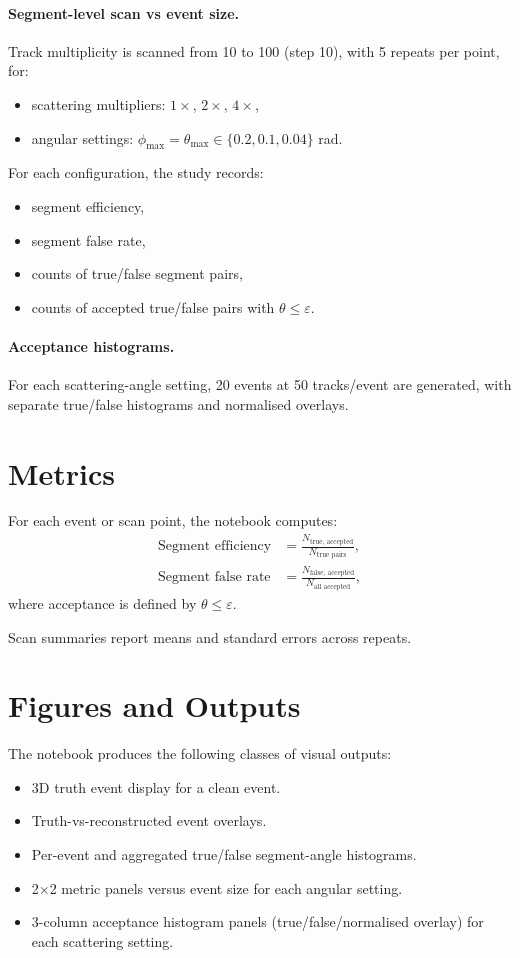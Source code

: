 \documentclass[11pt,a4paper]{article}
\begin{document}
\paragraph{Segment-level scan vs event size.}
Track multiplicity is scanned from 10 to 100 (step 10), with 5 repeats per
point, for:
\begin{itemize}[leftmargin=1.5em]
  \item scattering multipliers: $1\times$, $2\times$, $4\times$,
  \item angular settings: $\phi_{\max}=\theta_{\max}\in\{0.2,0.1,0.04\}$ rad.
\end{itemize}
For each configuration, the study records:
\begin{itemize}[leftmargin=1.5em]
  \item segment efficiency,
  \item segment false rate,
  \item counts of true/false segment pairs,
  \item counts of accepted true/false pairs with $\theta\le\varepsilon$.
\end{itemize}

\paragraph{Acceptance histograms.}
For each scattering-angle setting, 20 events at 50 tracks/event are generated,
with separate true/false histograms and normalised overlays.

\section{Metrics}
For each event or scan point, the notebook computes:
\begin{align}
\text{Segment efficiency} &=
\frac{N_{\text{true, accepted}}}{N_{\text{true pairs}}},\\
\text{Segment false rate} &=
\frac{N_{\text{false, accepted}}}{N_{\text{all accepted}}},
\end{align}
where acceptance is defined by $\theta\le\varepsilon$.

Scan summaries report means and standard errors across repeats.

\section{Figures and Outputs}
The notebook produces the following classes of visual outputs:
\begin{itemize}[leftmargin=1.5em]
  \item 3D truth event display for a clean event.
  \item Truth-vs-reconstructed event overlays.
  \item Per-event and aggregated true/false segment-angle histograms.
  \item 2$\times$2 metric panels versus event size for each angular setting.
  \item 3-column acceptance histogram panels (true/false/normalised overlay)
  for each scattering setting.
\end{itemize}
\end{document}
